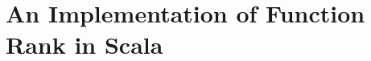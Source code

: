 \chapter{An Implementation of Function Rank in Scala}

\begin{singlespacing} 
\begin{small}
\end{small}
\end{singlespacing}
